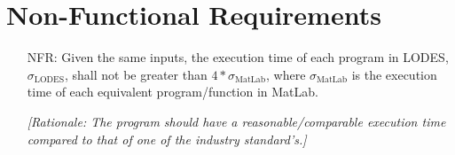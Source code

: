 \documentclass[12pt]{article}
\newcounter{nfrnum} %
\begin{document}
\section{Non-Functional Requirements} \label{NFR}
\begin{itemize}
\item[NFR\refstepcounter{nfrnum}\thenfrnum \label{NFR_sigma}:]
Given the same inputs, the execution time of each program in LODES, $\sigma_\text{LODES}$,
shall not be greater than $4 * \sigma_\text{MatLab}$,
where $\sigma_\text{MatLab}$ is the execution time of each equivalent program/function in MatLab.

\textit{[Rationale: The program should have a reasonable/comparable execution time compared to that of one of the industry standard's.]}
\end{itemize}
\end{document}
